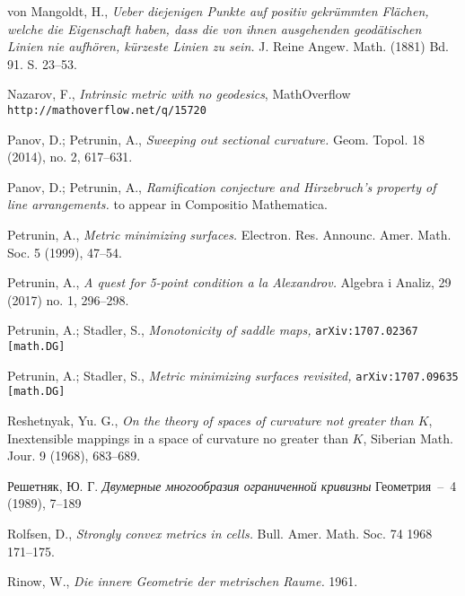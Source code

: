 \begin{thebibliography}{52}
von Mangoldt, H., 
\textit{Ueber diejenigen Punkte auf positiv gekr\"ummten Fl\"achen, welche die Eigenschaft haben, dass die von ihnen ausgehenden geod\"atischen Linien nie aufh\"oren, k\"urzeste Linien zu sein.} 
J. Reine Angew. Math. (1881) Bd. 91. S. 23--53.

Nazarov, F.,
\textit{Intrinsic metric with no geodesics},
MathOverflow \texttt{http://mathoverflow.net/q/15720}

Panov, D.; Petrunin, A.,
\textit{Sweeping out sectional curvature.} 
Geom. Topol. 
18 
(2014), 
no. 2, 
617--631. 

Panov, D.; Petrunin, A.,
\textit{Ramification conjecture and Hirzebruch's property of line arrangements.}
to appear in Compositio Mathematica.

Petrunin, A.,
\textit{Metric minimizing surfaces.}
Electron. Res. Announc. Amer. Math. Soc. 
5 
(1999), 
47--54.

Petrunin, A.,
\textit{A quest for 5-point condition a la Alexandrov.}
Algebra i Analiz, 29 (2017) no. 1, 296--298.



Petrunin, A.; 
Stadler, S., 
\textit{Monotonicity of saddle maps,}
\texttt{arXiv:1707.02367 [math.DG]}

Petrunin, A.; 
Stadler, S., 
\textit{Metric minimizing surfaces revisited,}
\texttt{arXiv:1707.09635 [math.DG]}

Reshetnyak, Yu. G.,
\textit{On the theory of spaces of curvature not greater than $K$},
Inextensible mappings in a space of curvature
no greater than $K$, Siberian Math. Jour. 9 (1968), 683--689.

\begin{otherlanguage}{russian}
Решетняк, Ю. Г.
\textit{Двумерные многообразия ограниченной кривизны}
Геометрия~--~4 (1989), 7--189
\end{otherlanguage}

Rolfsen, D.,
\textit{Strongly convex metrics in cells.}
Bull. Amer. Math. Soc. 74 1968 171–175.

Rinow, W., 
\textit{Die innere Geometrie der metrischen Raume.} 1961.


\end{thebibliography}
